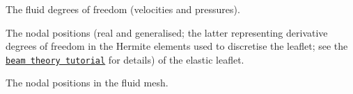 \begin{DoxyItemize}
\item The fluid degrees of freedom (velocities and pressures).~\newline
~\newline

\item The nodal positions (real and generalised; the latter representing derivative degrees of freedom in the Hermite elements used to discretise the leaflet; see the \href{../../../beam/tensioned_string/html/index.html}{\tt beam theory tutorial} for details) of the elastic leaflet.~\newline
~\newline

\item The nodal positions in the fluid mesh. ~\newline
~\newline


\end{DoxyItemize}
